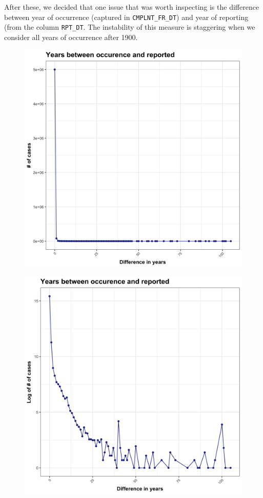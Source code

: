 \documentclass{article}
\begin{document}
After these, we decided that one issue that was worth inspecting is the difference between year of occurrence (captured in \texttt{CMPLNT\_FR\_DT}) and year of reporting (from the column \texttt{RPT\_DT}. The instability of this measure is staggering when we consider all years of occurrence after 1900.   

\begin{figure}[H]
\centering
\includegraphics[scale=0.14]{8_DiffYears.png}
\end{figure}

\begin{figure}[H]
\centering
\includegraphics[scale=0.14]{9_LogDiffYears.png}
\end{figure}
\end{document}
